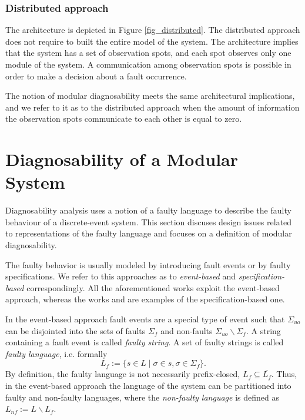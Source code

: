 \documentclass[letterpaper, 10pt, conference]{ieeeconf}
\begin{document}
\subsubsection{Distributed approach}
The architecture is depicted in Figure \ref{fig_distributed}.
The distributed approach does not require to built the entire model of the
system. The architecture implies that the system has a set of observation spots,
and each spot observes only one module of the system. A communication among
observation spots is possible in order to make a decision about a fault
occurrence. 

The notion of modular diagnosability meets the same architectural implications,
and we refer to it as to the distributed approach when the amount of information
the observation spots communicate to each other is equal to zero.


\section{Diagnosability of a Modular System}
\label{sec:Diagnosability}

Diagnosability analysis uses a notion of a faulty language to describe the
faulty behaviour of a discrete-event system. This section discuses design issues
related to representations of the faulty language and focuses on a definition
of modular diagnosability.

The faulty behavior is usually modeled by introducing fault events or by faulty
specifications. We refer to this approaches as to \emph{event-based} and
\emph{specification-based} correspondingly. All the aforementioned works exploit
the event-based approach, whereas the works \cite{zhou_decentralized_2008} and
\cite{sartini_methodology_2010} are examples of the specification-based one.

In the event-based approach fault events are a special type of event such that
$\Sigma_{uo}$ can be disjointed into the sets of faults $\Sigma_f$ and
non-faults $\Sigma_{uo}\backslash \Sigma_f$. A string containing a fault event
is called \emph{faulty string}. A set of faulty strings is called \emph{faulty
language}, i.e. formally 
$$L_f := \{ s \in L \mid \sigma \in s, \sigma \in \Sigma_f\}.$$ 
By definition, the faulty language is not necessarily prefix-closed,
$L_f \subseteq \overline{L_f}$. Thus, in the event-based approach the language
of the system can be partitioned into faulty and non-faulty languages, where the
\emph{non-faulty language} is defined as $L_{nf} := L \backslash L_f$.
\end{document}
